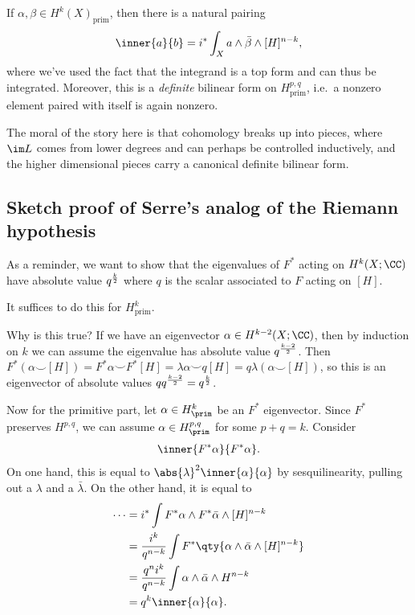 \begin{theorem}

If \(\alpha, \beta \in H^k(X)_{\text{prim}}\), then there is a natural
pairing
\begin{align*}  
\inner{a}{b} = i^* \int_X a\wedge \bar{\beta} \wedge [H]^{n-k}
,\end{align*} where we've used the fact that the integrand is a top form
and can thus be integrated. Moreover, this is a \emph{definite} bilinear
form on \(H^{p, q}_{\text{prim}}\), i.e.~a nonzero element paired with
itself is again nonzero.

\end{theorem}

The moral of the story here is that cohomology breaks up into pieces,
where \(\im L\) comes from lower degrees and can perhaps be controlled
inductively, and the higher dimensional pieces carry a canonical
definite bilinear form.

\hypertarget{sketch-proof-of-serres-analog-of-the-riemann-hypothesis}{%
\subsection{Sketch proof of Serre's analog of the Riemann
hypothesis}\label{sketch-proof-of-serres-analog-of-the-riemann-hypothesis}}

As a reminder, we want to show that the eigenvalues of \(F^*\) acting on
\(H^k(X; \CC)\) have absolute value \(q^{k\over 2}\) where \(q\) is the
scalar associated to \(F\) acting on \([H]\).

\begin{claim}

It suffices to do this for \(H^k_{\text{prim}}\).

\end{claim}

Why is this true? If we have an eigenvector
\(\alpha\in H^{k-2}(X; \CC)\), then by induction on \(k\) we can assume
the eigenvalue has absolute value \(q^{k-2 \over 2}\). Then
\(F^*(\alpha \smile [H]) = F^* \alpha \smile F^*[H] = \lambda \alpha \smile q[H] = q\lambda (\alpha \smile [H])\),
so this is an eigenvector of absolute values
\(q q^{k-2\over 2} = q^{k\over 2}\).

Now for the primitive part, let \(\alpha\in H^k_{\prim}\) be an \(F^*\)
eigenvector. Since \(F^*\) preserves \(H^{p, q}\), we can assume
\(\alpha \in H^{p, q}_{\prim}\) for some \(p+q=k\). Consider
\begin{align*}  
\inner{F^* \alpha}{F^*\alpha}
.\end{align*} On one hand, this is equal to
\(\abs{\lambda}^2 \inner{\alpha}{\alpha}\) by sesquilinearity, pulling
out a \(\lambda\) and a \(\bar \lambda\). On the other hand, it is equal
to
\begin{align*}  
\cdots 
&= i^* \int F^* \alpha \wedge F^* \bar \alpha \wedge [H]^{n-k} \\
&= {i^k \over q^{n-k}} \int F^*\qty{\alpha \wedge \bar\alpha \wedge [H]^{n-k} } \\
&= {q^n i^k \over q^{n-k}} \int \alpha \wedge \bar \alpha \wedge H^{n-k} \\
&= q^k \inner{\alpha}{\alpha}
.\end{align*}

